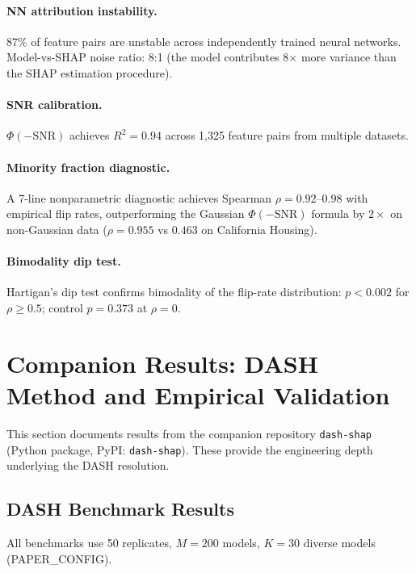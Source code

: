 \documentclass[11pt,a4paper]{article}
\begin{document}
\paragraph{NN attribution instability.}
87\% of feature pairs are unstable across independently trained neural networks.  Model-vs-SHAP noise ratio: 8:1 (the model contributes 8$\times$ more variance than the SHAP estimation procedure).

\paragraph{SNR calibration.}
$\Phi(-\mathrm{SNR})$ achieves $R^2 = 0.94$ across 1,325 feature pairs from multiple datasets.

\paragraph{Minority fraction diagnostic.}
A 7-line nonparametric diagnostic achieves Spearman $\rho = 0.92$--$0.98$ with empirical flip rates, outperforming the Gaussian $\Phi(-\mathrm{SNR})$ formula by $2\times$ on non-Gaussian data ($\rho = 0.955$ vs $0.463$ on California Housing).

\paragraph{Bimodality dip test.}
Hartigan's dip test confirms bimodality of the flip-rate distribution: $p < 0.002$ for $\rho \geq 0.5$; control $p = 0.373$ at $\rho = 0$.


\section{Companion Results: DASH Method and Empirical Validation}
\label{sec:companion-dash}

This section documents results from the companion repository \texttt{dash-shap} (Python package, PyPI: \texttt{dash-shap}).  These provide the engineering depth underlying the DASH resolution.

\subsection{DASH Benchmark Results}

All benchmarks use 50 replicates, $M = 200$ models, $K = 30$ diverse models (PAPER\_CONFIG).
\end{document}
